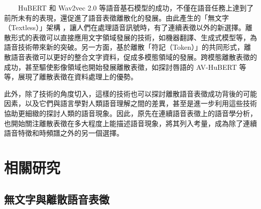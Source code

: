 {
{  %
} %
{  %

　　HuBERT \cite{hsu_hubert_2021, hsu_hubert_2021-2} 和 Wav2vec 2.0 \cite{baevski2020wav2vec} 等語音基石模型的成功，不僅在語音任務上達到了前所未有的表現，還促進了語音表徵離散化的發展。由此產生的「無文字（Textless）」架構 \cite{noauthor_textless_2021, lakhotia_generative_2021, lakhotia_generative_2021-1}，讓人們在處理語音訊號時，有了連續表徵以外的新選擇。離散形式的表徵可以直接應用文字領域發展的技術，如機器翻譯、生成式模型等，為語音技術帶來新的突破。另一方面，基於離散「符記（Token）」的共同形式，離散語音表徵可以更好的整合文字資料，促成多模態領域的發展。跨模態離散表徵的成功，甚至驅使影像領域也開始發展離散表徵，\jeffcomment{\textcolor{yellow}{(要確認一下「開始」嗎？)}}如探討唇語的 AV-HuBERT \cite{shi2021learning} 等等，展現了離散表徵在資料處理上的優勢。

        此外，除了技術的角度切入，這樣的技術也可以探討離散語音表徵成功背後的可能因素，以及它們與語言學對人類語音理解之間的差異，甚至是進一步利用這些技術協助更細緻的探討人類的語音現象。因此，原先在連續語音表徵上的語音學分析，也開始關注離散表徵在多大程度上能描述語音現象，將其列入考量，成為除了連續語音特徵和時頻譜之外的另一個選擇。

}  %
\section{相關研究}  

\subsection{無文字與離散語音表徵}

}
